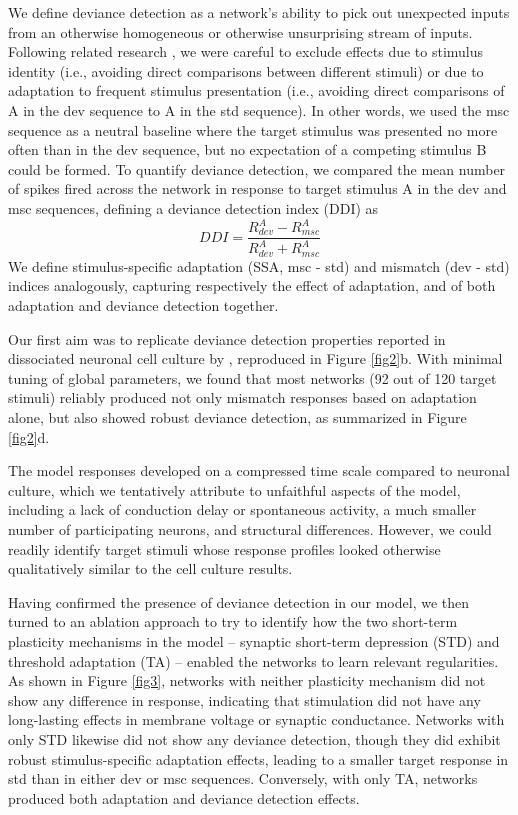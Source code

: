 \documentclass[pdflatex,referee,iicol,sn-basic]{sn-jnl}
\theoremstyle{thmstyleone}%
\theoremstyle{thmstyletwo}%
\theoremstyle{thmstylethree}%
\begin{document}
We define deviance detection as a network's ability to pick out unexpected inputs from an otherwise homogeneous or otherwise unsurprising stream of inputs. Following related research \citep{TODO}, we were careful to exclude effects due to stimulus identity (i.e., avoiding direct comparisons between different stimuli) or due to adaptation to frequent stimulus presentation (i.e., avoiding direct comparisons of A in the dev sequence to A in the std sequence). In other words, we used the msc sequence as a neutral baseline where the target stimulus was presented no more often than in the dev sequence, but no expectation of a competing stimulus B could be formed. To quantify deviance detection, we compared the mean number of spikes fired across the network in response to target stimulus A in the dev and msc sequences, defining a deviance detection index (DDI) as
\begin{equation}
    DDI = \frac{R^A_{dev} - R^A_{msc}}{R^A_{dev} + R^A_{msc}}
\end{equation}
We define stimulus-specific adaptation (SSA, msc - std) and mismatch (dev - std) indices analogously, capturing respectively the effect of adaptation, and of both adaptation and deviance detection together.

Our first aim was to replicate deviance detection properties reported in dissociated neuronal cell culture by \cite{Kubota2021-dx}, reproduced in Figure \ref{fig2}b. With minimal tuning of global parameters, we found that most networks (92 out of 120 target stimuli) reliably produced not only mismatch responses based on adaptation alone, but also showed robust deviance detection, as summarized in Figure \ref{fig2}d.

The model responses developed on a compressed time scale compared to neuronal culture, which we tentatively attribute to unfaithful aspects of the model, including a lack of conduction delay or spontaneous activity, a much smaller number of participating neurons, and structural differences. However, we could readily identify target stimuli whose response profiles looked otherwise qualitatively similar to the cell culture results.

Having confirmed the presence of deviance detection in our model, we then turned to an ablation approach to try to identify how the two short-term plasticity mechanisms in the model -- synaptic short-term depression (STD) and threshold adaptation (TA) -- enabled the networks to learn relevant regularities. As shown in Figure \ref{fig3}, networks with neither plasticity mechanism did not show any difference in response, indicating that stimulation did not have any long-lasting effects in membrane voltage or synaptic conductance. Networks with only STD likewise did not show any deviance detection, though they did exhibit robust stimulus-specific adaptation effects, leading to a smaller target response in std than in either dev or msc sequences. Conversely, with only TA, networks produced both adaptation and deviance detection effects.
\end{document}

